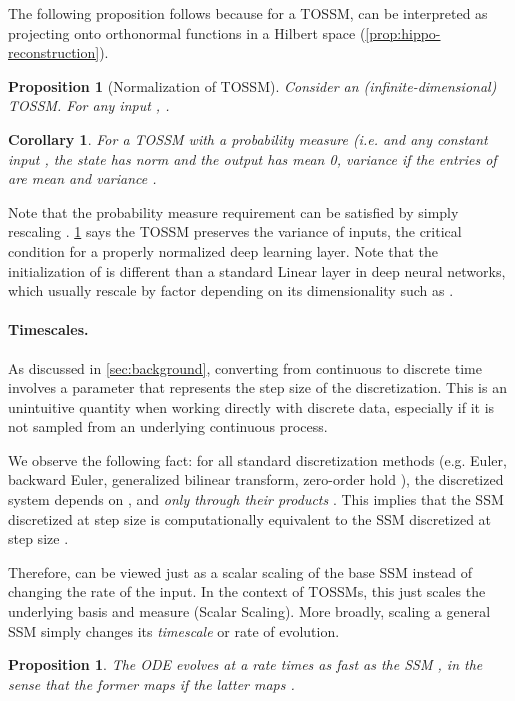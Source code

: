 \documentclass{article}
\newtheorem{corollary}[lemma]{Corollary}
\newtheorem{proposition}[theorem]{Proposition}
\newcommand{\para}[1]{\paragraph{#1}}
\begin{document}
The following proposition follows because for a TOSSM,  can be interpreted as projecting onto orthonormal functions in a Hilbert space (\cref{prop:hippo-reconstruction}).
\begin{proposition}[Normalization of TOSSM]\label{prop:ssm-normalization}
  Consider an (infinite-dimensional) TOSSM.
  For any input ,
  .
\end{proposition}


\begin{corollary}\label{cor:ssm-normalization}
  For a TOSSM with a probability measure (i.e. 
  and  any constant input ,
  the state has norm  and the output  has mean 0, variance  if the entries of  are mean  and variance .
\end{corollary}
  Note that the probability measure requirement can be satisfied by simply rescaling .
\cref{cor:ssm-normalization} says the TOSSM preserves the variance of inputs, the critical condition for a properly normalized deep learning layer.
Note that the initialization of  is different than a standard Linear layer in deep neural networks, which usually rescale by factor depending on its dimensionality such as  \citep{glorot2010understanding}.


\para{Timescales.}
As discussed in \cref{sec:background}, converting from continuous to discrete time involves a parameter  that represents the step size of the discretization.
This is an unintuitive quantity when working directly with discrete data, especially if it is not sampled from an underlying continuous process.

We observe the following fact:
for all standard discretization methods (e.g. Euler, backward Euler, generalized bilinear transform, zero-order hold \citep{gu2021lssl}), the discretized system depends on , and  \emph{only through their products} .
This implies that the SSM  discretized at step size  is computationally equivalent to the SSM  discretized at step size .

Therefore,  can be viewed just as a scalar scaling of the base SSM instead of changing the rate of the input.
In the context of TOSSMs, this just scales the underlying basis and measure (Scalar Scaling).
More broadly, scaling a general SSM simply changes its \emph{timescale} or rate of evolution.
\begin{proposition}The ODE  evolves at a rate  times as fast as the SSM ,
  in the sense that the former maps  if the latter maps .
\end{proposition}
\end{document}
